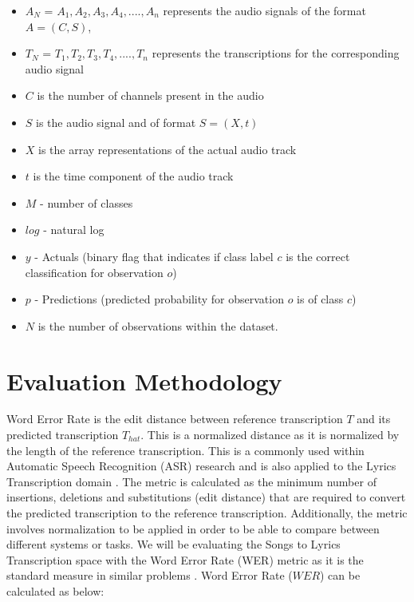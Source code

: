 \begin{itemize}
    \item $A_N$ = $A_{1},A_2,A_3,A_4,...., A_n$ represents the audio signals of the format $A = (C,S)$,
    \item $T_N$ = $T_1,T_2,T_3,T_4,....,T_n$ represents the transcriptions for the corresponding audio signal
    \item $C$ is the number of channels present in the audio
    \item $S$ is the audio signal and of format $S = (X,t)$
    \item $X$ is the array representations of the actual audio track
    \item $t$ is the time component of the audio track
    \item $M$ - number of classes
    \item $log$ - natural log
    \item $y$ - Actuals (binary flag that indicates if class label $c$ is the correct classification for observation $o$)
    \item $p$ - Predictions (predicted probability for observation $o$ is of class $c$)
    \item $N$ is the number of observations within the dataset.
\end{itemize}


\section{Evaluation Methodology}%
\label{sec:evaluationmetric}

Word Error Rate \cite{zechner2000minimizing} is the edit distance between reference transcription $T$ and its predicted transcription $T_{hat}$. This is a normalized distance as
it is normalized by the length of the reference transcription. This is a commonly used within Automatic Speech Recognition (ASR) research \cite{zechner2000minimizing} \cite{baevski2020wav2vec} \cite{mccowan2004use}  and is also applied to the Lyrics Transcription domain \cite{ou2022transfer} \cite{gu2022mm}. The metric is calculated as the minimum number of insertions, deletions and substitutions (edit distance) that are required to convert the predicted transcription to the reference transcription. Additionally, the metric involves normalization to be applied in order to be able to compare between different systems or tasks. We will be evaluating the Songs to Lyrics Transcription space with the Word Error Rate (WER) metric as it is the standard measure in similar problems \cite{ou2022transfer} \cite{xu2021self}. Word Error Rate ($WER$) can be calculated as below:

